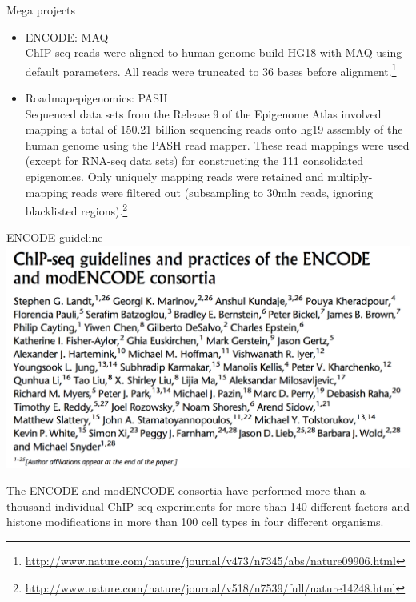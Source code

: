 \documentclass{beamer}
\begin{document}
\begin{frame}{Mega projects}
\begin{itemize}
\item ENCODE: MAQ\\
ChIP-seq reads were aligned to human genome build HG18 with MAQ using default parameters. All reads were truncated to 36 bases before alignment.\footnote{\url{http://www.nature.com/nature/journal/v473/n7345/abs/nature09906.html}}
\item Roadmapepigenomics: PASH\\
Sequenced data sets from the Release 9 of the Epigenome Atlas involved mapping a total of 150.21 billion sequencing reads onto hg19 assembly of the human genome using the PASH read mapper. These read mappings were used (except for RNA-seq data sets) for constructing the 111 consolidated epigenomes. Only uniquely mapping reads were retained and multiply-mapping reads were filtered out (subsampling to 30mln reads, ignoring blacklisted regions).\footnote{\url{http://www.nature.com/nature/journal/v518/n7539/full/nature14248.html}}
\end{itemize}
\end{frame}

\begin{frame}{ENCODE guideline}
\includegraphics[width=\linewidth]{paperENCODE.png}
\end{frame}

\begin{frame}
The ENCODE and modENCODE consortia have performed more than a thousand individual ChIP-seq experiments for more than 140 different factors and histone modifications in more than 100 cell types in four different organisms.
\end{frame}
\end{document}
